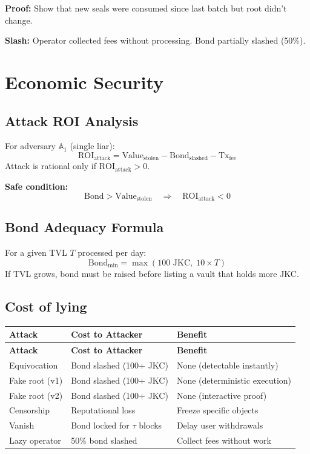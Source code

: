\documentclass[a4paper,11pt]{article}
\begin{document}
\textbf{Proof:} Show that new seals were consumed since last batch but root didn't change.

\textbf{Slash:} Operator collected fees without processing. Bond partially slashed (50\%).

\section{Economic Security}

\subsection{Attack ROI Analysis}

For adversary $\mathbb{A}_1$ (single liar):
\[
    \text{ROI}_{\text{attack}} = \text{Value}_{\text{stolen}} - \text{Bond}_{\text{slashed}} - \text{Tx}_{\text{fee}}
\]
Attack is rational only if $\text{ROI}_{\text{attack}} > 0$.

\textbf{Safe condition:}
\[
    \text{Bond} > \text{Value}_{\text{stolen}} \quad \Rightarrow \quad \text{ROI}_{\text{attack}} < 0
\]

\subsection{Bond Adequacy Formula}

For a given TVL $T$ processed per day:
\[
    \text{Bond}_{\min} = \max(100 \text{ JKC},\; 10 \times T)
\]
If TVL grows, bond must be raised before listing a vault that holds more JKC.

\subsection{Cost of lying}

\begin{longtable}{lll}
\toprule
\textbf{Attack} & \textbf{Cost to Attacker} & \textbf{Benefit} \\
\midrule
\endfirsthead
\toprule
\textbf{Attack} & \textbf{Cost to Attacker} & \textbf{Benefit} \\
\midrule
\endhead
Equivocation & Bond slashed (100+ JKC) & None (detectable instantly) \\
Fake root (v1) & Bond slashed (100+ JKC) & None (deterministic execution) \\
Fake root (v2) & Bond slashed (100+ JKC) & None (interactive proof) \\
Censorship & Reputational loss & Freeze specific objects \\
Vanish & Bond locked for $\tau$ blocks & Delay user withdrawals \\
Lazy operator & 50\% bond slashed & Collect fees without work \\
\bottomrule
\end{longtable}
\end{document}
